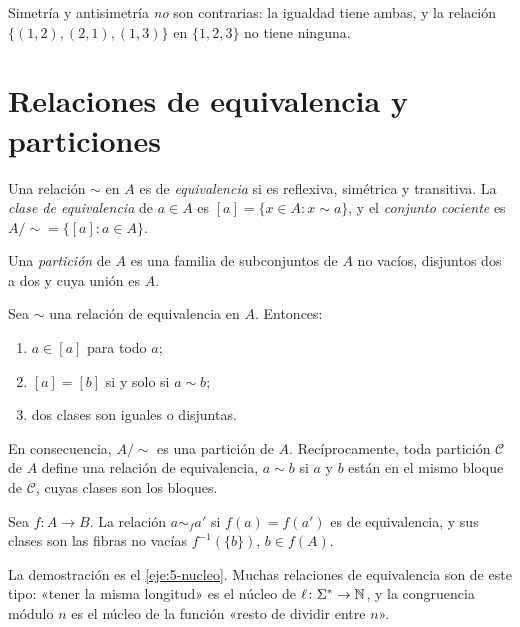 Simetría y antisimetría \emph{no} son contrarias: la igualdad tiene ambas, y la relación $\{(1,2),(2,1),(1,3)\}$ en $\{1,2,3\}$ no tiene ninguna.

\section{Relaciones de equivalencia y particiones}

\begin{definicion}
Una relación $\sim$ en $A$ es de \emph{equivalencia} si es reflexiva, simétrica y transitiva. La \emph{clase de equivalencia} de $a\in A$ es $[a]=\{x\in A: x\sim a\}$, y el \emph{conjunto cociente} es $A/{\sim}=\{[a]: a\in A\}$.
\end{definicion}

\begin{definicion}[Partición]
Una \emph{partición} de $A$ es una familia de subconjuntos de $A$ no vacíos, disjuntos dos a dos y cuya unión es $A$.
\end{definicion}

\begin{teorema}\label{teo:t5-particion}
Sea $\sim$ una relación de equivalencia en $A$. Entonces:
\begin{enumerate}
  \item $a\in[a]$ para todo $a$;
  \item $[a]=[b]$ si y solo si $a\sim b$;
  \item dos clases son iguales o disjuntas.
\end{enumerate}
En consecuencia, $A/{\sim}$ es una partición de $A$. Recíprocamente, toda partición $\mathcal{C}$ de $A$ define una relación de equivalencia, $a\sim b$ si $a$ y $b$ están en el mismo bloque de $\mathcal{C}$, cuyas clases son los bloques.
\end{teorema}

\addtocounter{definicion}{1}%

\begin{proposicion}\label{prop:t5-nucleo}
Sea $f\colon A\to B$. La relación $a\sim_f a'$ si $f(a)=f(a')$ es de equivalencia, y sus clases son las fibras no vacías $f^{-1}(\{b\})$, $b\in f(A)$.
\end{proposicion}

La demostración es el \cref{eje:5-nucleo}. Muchas relaciones de equivalencia son de este tipo: «tener la misma longitud» es el núcleo de $\ell\colon\Sigma^{*}\to\mathbb{N}$, y la congruencia módulo $n$ es el núcleo de la función «resto de dividir entre $n$».

